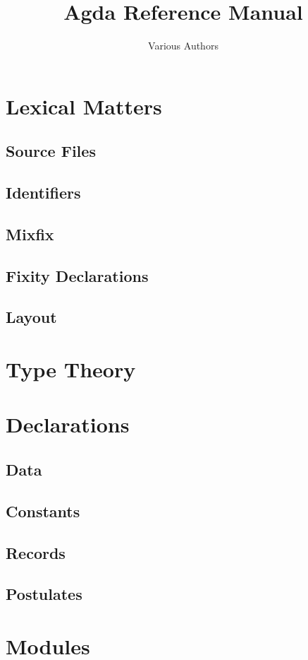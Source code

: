\documentclass{article}
\begin{document}
\title{Agda Reference Manual}
\author{Various Authors}
\maketitle
\section{Lexical Matters}
\subsection{Source Files}
\subsection{Identifiers}
\subsection{Mixfix}
\subsection{Fixity Declarations}
\subsection{Layout}
\section{Type Theory}
\section{Declarations}
\subsection{Data}
\subsection{Constants}
\subsection{Records}
\subsection{Postulates}
\section{Modules}
\end{document}
